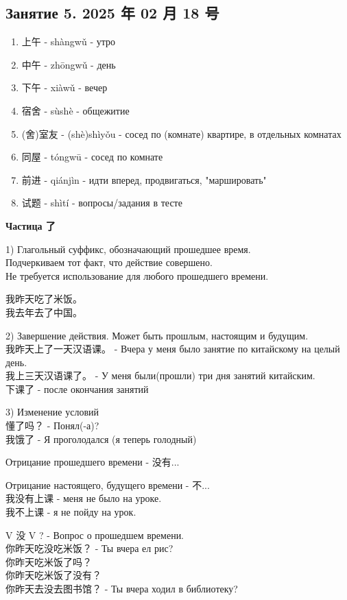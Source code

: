 \newpage
\subsection{Занятие 5. 2025 年 02 月 18 号}
\begin{newwords}
	\begin{enumerate}\hfill
		\item 上午 - shàngwǔ - утро
		\item 中午 - zhōngwǔ - день
		\item 下午 - xiàwǔ - вечер
		\item 宿舍 - sùshè - общежитие
		\item (舍)室友 - (shè)shìyǒu - сосед по (комнате) квартире, в отдельных комнатах
		\item 同屋 - tóngwū - сосед по комнате
		\item 前进 - qiánjìn - идти вперед, продвигаться, "маршировать"
		\item 试题 - shìtí - вопросы/задания в тесте
	\end{enumerate}
\end{newwords}

\textbf{Частица 了}

1) Глагольный суффикс, обозначающий прошедшее время.\\
Подчеркиваем тот факт, что действие совершено.\\
Не требуется использование для любого прошедшего времени.
\begin{example}\hfill\break
	我昨天吃了米饭。\\
	我去年去了中国。
\end{example}
2) Завершение действия. Может быть прошлым, настоящим и будущим.\\
我昨天上了一天汉语课。 - Вчера у меня было занятие по китайскому на целый день.\\
我上三天汉语课了。 - У меня были(прошли) три дня занятий китайским.\\ 
下课了 - после окончания занятий

3) Изменение условий\\
懂了吗？ - Понял(-а)?\\
我饿了 - Я проголодался (я теперь голодный)

Отрицание прошедшего времени - 没有...

Отрицание настоящего, будущего времени - 不...\\
我没有上课 - меня не было на уроке.\\
我不上课 - я не пойду на урок.

V 没 V ? - Вопрос о прошедшем времени.\\
你昨天吃没吃米饭？ - Ты вчера ел рис?\\
你昨天吃米饭了吗？\\
你昨天吃米饭了没有？\\
你昨天去没去图书馆？ - Ты вчера ходил в библиотеку?\\
